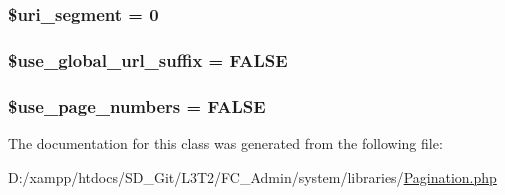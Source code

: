 \subsubsection[{\$uri\+\_\+segment}]{\setlength{\rightskip}{0pt plus 5cm}\$uri\+\_\+segment = 0\hspace{0.3cm}{\ttfamily [protected]}}\label{class_c_i___pagination_a79fd9718cc6c432f6919c28299584d77}
\hypertarget{class_c_i___pagination_aa2ec11ced927cd6f4e62fa19a4e35325}{}
\subsubsection[{\$use\+\_\+global\+\_\+url\+\_\+suffix}]{\setlength{\rightskip}{0pt plus 5cm}\$use\+\_\+global\+\_\+url\+\_\+suffix = F\+A\+L\+S\+E\hspace{0.3cm}{\ttfamily [protected]}}\label{class_c_i___pagination_aa2ec11ced927cd6f4e62fa19a4e35325}
\hypertarget{class_c_i___pagination_ac19b7d290389a9188ca6466f85d14a85}{}
\subsubsection[{\$use\+\_\+page\+\_\+numbers}]{\setlength{\rightskip}{0pt plus 5cm}\$use\+\_\+page\+\_\+numbers = F\+A\+L\+S\+E\hspace{0.3cm}{\ttfamily [protected]}}\label{class_c_i___pagination_ac19b7d290389a9188ca6466f85d14a85}


The documentation for this class was generated from the following file\+:\begin{DoxyCompactItemize}
\item 
D\+:/xampp/htdocs/\+S\+D\+\_\+\+Git/\+L3\+T2/\+F\+C\+\_\+\+Admin/system/libraries/\hyperlink{_pagination_8php}{Pagination.\+php}\end{DoxyCompactItemize}
